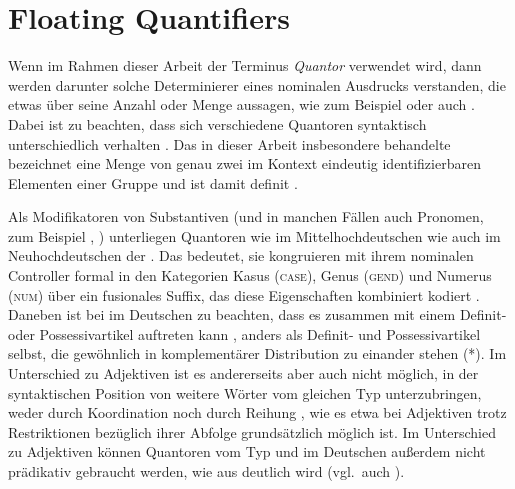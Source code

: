 \section{Floating Quantifiers}
\label{sec:floatquant}

Wenn im Rahmen dieser Arbeit der Terminus \textit{Quantor} verwendet wird, dann
werden darunter solche Determinierer eines nominalen Ausdrucks verstanden, die
etwas über seine Anzahl oder Menge aussagen, wie zum Beispiel  oder auch . Dabei ist zu beachten, dass sich verschiedene
Quantoren syntaktisch unterschiedlich verhalten
\autocites[27--28]{pittner1995}[11--12]{haspelmath1997}. Das in dieser Arbeit
insbesondere behandelte  bezeichnet eine Menge von genau zwei
im Kontext eindeutig identifizierbaren Elementen einer Gruppe
\autocite[vgl.][307]{keenan2006} und ist damit definit
\autocite[265--268]{lyons1999}.

Als Modifikatoren von Substantiven (und in manchen Fällen auch Pronomen, zum
Beispiel , ) unterliegen Quantoren wie
 im Mittelhochdeutschen wie auch 
im Neuhochdeutschen der . Das
bedeutet, sie kongruieren mit ihrem nominalen Controller formal in den
Kategorien Kasus (\textsc{case}), Genus (\textsc{gend}) und Numerus
(\textsc{num}) über ein fusionales Suffix, das diese Eigenschaften kombiniert
kodiert \autocites(vgl.~auch ,
)[181--184]{ksw2}[772]{woellstein2022}. Daneben ist bei
 im Deutschen zu beachten, dass es zusammen mit
einem Definit- oder Possessivartikel auftreten kann , anders
als Definit- und Possessivartikel selbst, die gewöhnlich in komplementärer
Distribution zu einander stehen (*). Im Unterschied zu
Adjektiven ist es andererseits aber auch nicht möglich,
in der syntaktischen Position von  weitere Wörter vom gleichen Typ
unterzubringen, weder durch Koordination  noch durch Reihung
, wie es etwa bei Adjektiven trotz
Restriktionen bezüglich ihrer Abfolge grundsätzlich möglich ist. Im Unterschied
zu Adjektiven können Quantoren vom Typ  und
 im Deutschen außerdem nicht prädikativ gebraucht
werden, wie aus  deutlich wird (vgl.~auch \cite[181,
Fußnote~1]{merchant1996}).

